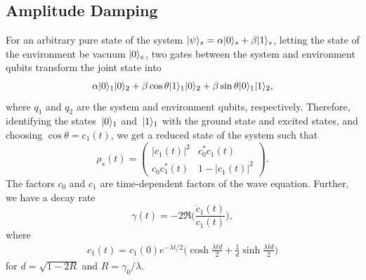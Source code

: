\documentclass[12pt, twocolumn]{article}
\newcommand*{\eu}{e}
\DeclarePairedDelimiter{\ket}{\lvert}{\rangle}
\begin{document}
  \subsection{Amplitude Damping}
  For an arbitrary pure state of the system \( \ket{\psi}_{s} = \alpha \ket{0}_{s} + \beta \ket{1}_{s} \), letting the state of the environment be vacuum \( \ket{0}_{e} \), two gates between the system and environment qubits transform the joint state into
  \begin{equation*}
    \alpha \ket{0}_{1} \ket{0}_{2} + \beta \cos \theta \ket{1}_{1} \ket{0}_{2}
    + \beta \sin \theta \ket{0}_{1} \ket{1}_{2},
  \end{equation*}
  where \( q_{1} \) and \( q_{2} \) are the system and environment qubits, respectively. Therefore, identifying the states~\( \ket{0}_{1} \) and~\( \ket{1}_{1} \) with the ground state and excited states, and choosing \( \cos \theta = c_{1}(t) \), we get a reduced state of the system such that
  \begin{equation}
    \rho_{s}(t)
      = \begin{pmatrix}
          \lvert c_{1}^{}(t) \rvert^{2} & c_{0}^{*} c_{1}^{}(t)             \\
          c_{0}^{} c_{1}^{*}(t)         & 1 - \lvert c_{1}^{}(t) \rvert^{2}
        \end{pmatrix}.
  \end{equation}
  The factors \( c_{0} \) and \( c_{1} \) are time-dependent factors of the wave equation. Further, we have a decay rate
  \begin{equation}
    \gamma(t) = -2 \Re \biggl( \frac{\dot{c}_{1}(t)}{c_{1}(t)} \biggr),
  \end{equation}
  where
  \begin{align}
    c_{1}(t)
      = c_{1}(0) \eu^{-\lambda t / 2}
        \biggl(
          \cosh \frac{\lambda t d}{2}
            + \frac{1}{d}
              \sinh \frac{\lambda t d}{2}
        \biggr)
  \end{align}
  for \( d = \sqrt{1 - 2 R} \) and \( R = \gamma_{0} / \lambda \).
\end{document}
